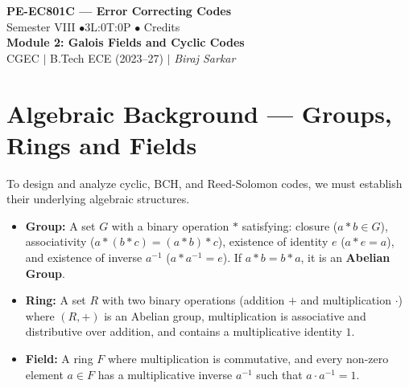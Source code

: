 \documentclass[12pt,a4paper]{article}
\begin{document}

\begin{center}
  {\LARGE\bfseries\color{myred} PE-EC801C --- Error Correcting Codes}\\[5pt]
  {\normalsize\color{mydark} Semester VIII \quad$\bullet$\quad 3L:0T:0P \quad$\bullet$ Credits}\\[3pt]
  {\normalsize\color{myteal}\textbf{Module 2: Galois Fields and Cyclic Codes}}\\[3pt]
  {\small\color{mydark} CGEC \;$|$\; B.Tech ECE (2023--27) \;$|$\; \textit{Biraj Sarkar}}
\end{center}
\vspace{2pt}
\noindent{\color{myred}\rule{\linewidth}{1.5pt}}
\vspace{2pt}

\hypersetup{linkcolor=mydark}
\tableofcontents
\hypersetup{linkcolor=myteal}
\newpage

\section{Algebraic Background --- Groups, Rings and Fields}

To design and analyze cyclic, BCH, and Reed-Solomon codes, we must establish their underlying algebraic structures.

\begin{tcolorbox}[defbox, title={\textbf{Algebraic Structures Summary}}]
\begin{itemize}[leftmargin=*, itemsep=3pt, topsep=0pt]
  \item \textbf{Group:} A set $G$ with a binary operation $*$ satisfying: closure ($a * b \in G$), associativity ($a * (b * c) = (a * b) * c$), existence of identity $e$ ($a * e = a$), and existence of inverse $a^{-1}$ ($a * a^{-1} = e$). If $a * b = b * a$, it is an \textbf{Abelian Group}.
  \item \textbf{Ring:} A set $R$ with two binary operations (addition $+$ and multiplication $\cdot$) where $(R, +)$ is an Abelian group, multiplication is associative and distributive over addition, and contains a multiplicative identity $1$.
  \item \textbf{Field:} A ring $F$ where multiplication is commutative, and every non-zero element $a \in F$ has a multiplicative inverse $a^{-1}$ such that $a \cdot a^{-1} = 1$.
\end{itemize}
\end{tcolorbox}
\end{document}
